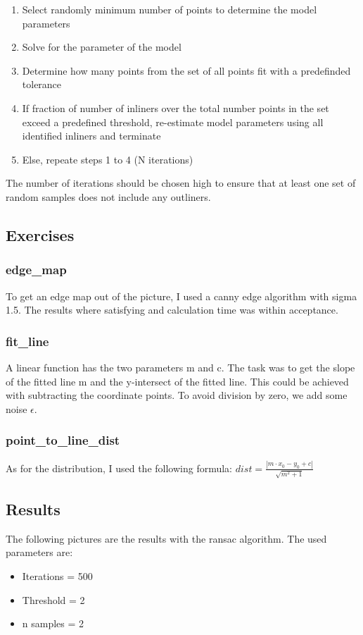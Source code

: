 \documentclass[12pt]{article}
\begin{document}
 \begin{enumerate}
     \item Select randomly minimum number of points to determine the model parameters
     \item Solve for the parameter of the model
     \item Determine how many points from the set of all points fit with a predefinded tolerance
     \item If fraction of number of inliners over the total number points in the set exceed a predefined threshold, re-estimate model parameters using all identified inliners and terminate
     \item Else, repeate steps 1 to 4 (N iterations)
 \end{enumerate}
 
 The number of iterations should be chosen high to ensure that at least one set of random samples does not include any outliners.

\subsection{Exercises}
\subsubsection{edge\_map}
To get an edge map out of the picture, I used a canny edge algorithm with sigma 1.5. The results where satisfying and calculation time was within
acceptance. 
\subsubsection{fit\_line}
A linear function has the two parameters m and c. The task was to get the slope of the fitted line m and the y-intersect of the fitted line.
This could be achieved with subtracting the coordinate points. To avoid division by zero, we add some noise $\epsilon$.
\subsubsection{point\_to\_line\_dist}
As for the distribution, I used the following formula: $dist = \frac{|m \cdot x_{0} - y_{0} + c|}{\sqrt{m^2+1}}$

\pagebreak
\subsection{Results}
The following pictures are the results with the ransac algorithm. The used parameters are:
\begin{itemize}
    \item Iterations = 500
    \item Threshold = 2
    \item n samples = 2
    \end{itemize}
\end{document}

